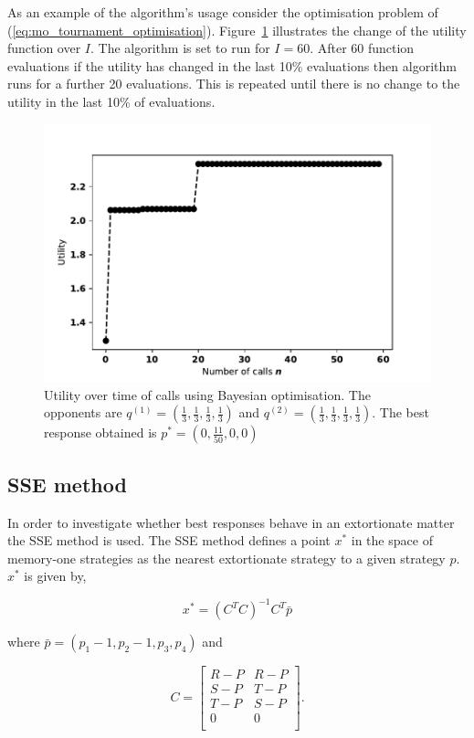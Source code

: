 As an example of the algorithm's usage consider the optimisation problem
of (\ref{eq:mo_tournament_optimisation}). Figure~\ref{bayesian_example}
illustrates the change of the utility function over \(I\).
The algorithm is set to run for \(I=60\). After 60 function evaluations if the
utility has changed in the last 10\% evaluations then algorithm runs for a
further 20 evaluations. This is repeated until there is no change to the utility
in the last 10\% of evaluations.


\begin{figure}[!htbp]
    \begin{center}
    \includegraphics[width=.5\linewidth]{src/chapters/05/paper/memory-size-in-the-prisoners-dilemma/img/bayesian_example.pdf}
    \end{center}
    \caption{Utility over time of calls using Bayesian optimisation. The
    opponents are \(q^{(1)} = (\frac{1}{3}, \frac{1}{3}, \frac{1}{3},
    \frac{1}{3})\) and \(q^{(2)} = (\frac{1}{3}, \frac{1}{3},
    \frac{1}{3}, \frac{1}{3})\). The best response obtained is \(p^* = (0, \frac{11}{50}, 0, 0)\)}
    \label{bayesian_example}
\end{figure}

\subsection{SSE method}\label{section:sse}

In order to investigate whether best responses behave in an extortionate matter
the SSE method is used. The SSE method defines a point \(x^*\) in the space of
memory-one strategies as the nearest extortionate strategy to a
given strategy \(p\). \(x^*\) is given by,

\begin{equation}\label{eqn:x_star_formula}
    x^* = {\left(C^{T}C\right)}^{-1}C^{T}\bar{p}
\end{equation}

where \(\bar{p}=(p_1 - 1, p_2 - 1, p_3, p_4)\) and

\begin{equation}\label{eq:definition_of_C}
    C =
    \begin{bmatrix}
        R - P & R- P \\
        S - P & T- P \\
        T - P & S- P \\
        0     & 0 \\
    \end{bmatrix}.
\end{equation}

